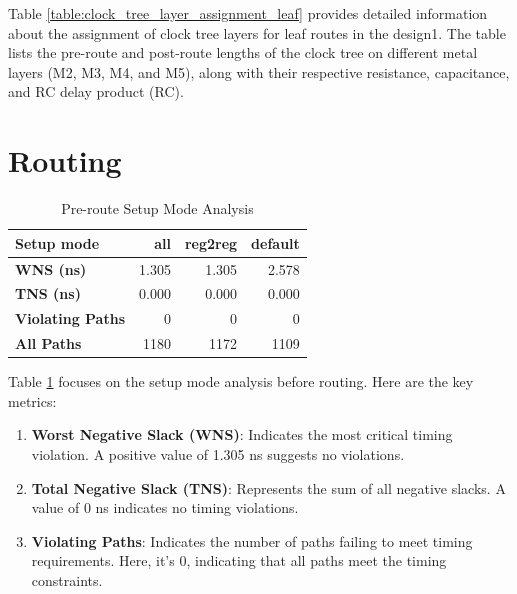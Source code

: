 Table \ref{table:clock_tree_layer_assignment_leaf} provides detailed information about the assignment of clock tree layers for leaf routes in the design1. The table lists the pre-route and post-route lengths of the clock tree on different metal layers (M2, M3, M4, and M5), along with their respective resistance, capacitance, and RC delay product (RC).


\section{Routing}
\begin{table}[H]
\centering
\caption{Pre-route Setup Mode Analysis}
\begin{tabular}{|l|r|r|r|}
\hline
\textbf{Setup mode} & \textbf{all} & \textbf{reg2reg} & \textbf{default} \\ \hline
\textbf{WNS (ns)} & 1.305 & 1.305 & 2.578 \\ \hline
\textbf{TNS (ns)} & 0.000 & 0.000 & 0.000 \\ \hline
\textbf{Violating Paths} & 0 & 0 & 0 \\ \hline
\textbf{All Paths} & 1180 & 1172 & 1109 \\ \hline
\end{tabular}
\label{table:pre_setup_analysis}
\end{table}
Table \ref{table:pre_setup_analysis} focuses on the setup mode analysis before routing. Here are the key metrics:
\begin{enumerate}
    \item \textbf{Worst Negative Slack (WNS)}: Indicates the most critical timing violation. A positive value of 1.305 ns suggests no violations.
    \item \textbf{Total Negative Slack (TNS)}: Represents the sum of all negative slacks. A value of 0 ns indicates no timing violations.
    \item \textbf{Violating Paths}: Indicates the number of paths failing to meet timing requirements. Here, it’s 0, indicating that all paths meet the timing constraints.
\end{enumerate}

